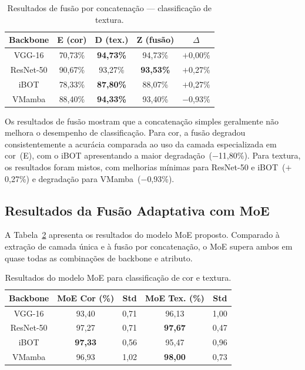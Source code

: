 \documentclass[letterpaper, 10 pt, conference]{ieeeconf}
\begin{document}
\begin{table}[htbp]
\caption{Resultados de fusão por concatenação --- classificação de textura.}
\begin{center}
\begin{tabular}{c|c|c|c|c}
\hline
\textbf{Backbone} & \textbf{E (cor)} & \textbf{D (tex.)}
                  & \textbf{Z (fusão)} & \textbf{$\Delta$} \\
\hline
VGG-16    & 70,73\% & \textbf{94,73\%} & 94,73\% & $+$0,00\% \\
ResNet-50 & 90,67\% & 93,27\%          & \textbf{93,53\%} & $+$0,27\% \\
iBOT      & 78,33\% & \textbf{87,80\%} & 88,07\% & $+$0,27\% \\
VMamba    & 88,40\% & \textbf{94,33\%} & 93,40\% & $-$0,93\% \\
\hline
\end{tabular}
\label{tab7}
\end{center}
\end{table}

Os resultados de fusão mostram que a concatenação simples geralmente não
melhora o desempenho de classificação.
Para cor, a fusão degradou consistentemente a acurácia comparada ao uso da
camada especializada em cor~(E), com o iBOT apresentando a maior
degradação~($-$11,80\%).
Para textura, os resultados foram mistos, com melhorias mínimas para
ResNet-50 e iBOT~($+$0,27\%) e degradação para VMamba~($-$0,93\%).

\subsection{Resultados da Fusão Adaptativa com MoE}

A Tabela~\ref{tab_moe} apresenta os resultados do modelo MoE proposto.
Comparado à extração de camada única e à fusão por concatenação, o MoE
supera ambos em quase todas as combinações de backbone e atributo.

\begin{table}[htbp]
\caption{Resultados do modelo MoE para classificação de cor e textura.}
\begin{center}
\begin{tabular}{c|c|c|c|c}
\hline
\textbf{Backbone} & \textbf{MoE Cor (\%)} & \textbf{Std}
                  & \textbf{MoE Tex. (\%)} & \textbf{Std} \\
\hline
VGG-16    & 93,40 & 0,71 & 96,13 & 1,00 \\
ResNet-50 & 97,27 & 0,71 & \textbf{97,67} & 0,47 \\
iBOT      & \textbf{97,33} & 0,56 & 95,47 & 0,96 \\
VMamba    & 96,93 & 1,02 & \textbf{98,00} & 0,73 \\
\hline
\end{tabular}
\label{tab_moe}
\end{center}
\end{table}
\end{document}
